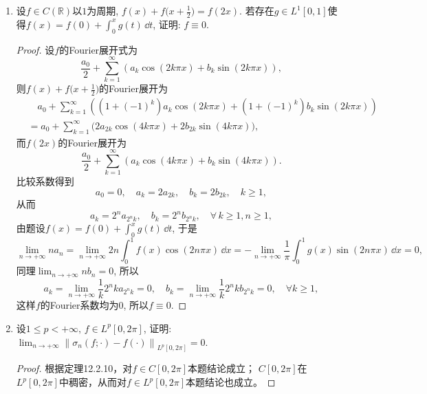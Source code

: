 \begin{quiza}
\begin{enumerate}
\begin{proof}[进阶]
\begin{align*}
=\lim _{n \rightarrow+\infty} \frac{1}{n^2} \int_0^{\frac{\pi}{2}} \frac{\sin^4 nx}{x^3} \, d x \\
& = \lim_{n \rightarrow+\infty} \int_0^{\frac{n\pi}{2}} \frac{\sin^4 x}{x^3} \, d x
=\int_0^{+\infty} \frac{\sin^4 x}{x^3} \, d x
=\int_0^{+\infty} \frac{2 \sin^3 x \cos x}{x^2} \, d x \\
& = \int_0^{+\infty} \frac{6 \sin^2 x \cos^2 x-2 \sin^4 x}{x} \, d x
=\int_0^{+\infty} \frac{\cos 2x-\cos 4x}{x} \, d x \\
& = \ln 2,
\end{align*}
其上第二个等式为变量代换，第四第五个等式用了分部积分，第六个等式是三角函数恒等变换，
第七个等式用了 Frullani 公式（也可以通过对含参变量反常积分求导来计算）。
\end{proof}
\item 设\(f\in C(\mathbb{R})\)以\(1\)为周期, \(f(x)+f\bigg(x+\frac{1}{2}\bigg)=f(2x)\). 
若存在\(g\in L^1[0,1]\)使得\(f(x)=f(0)+\int_{0}^{x}g(t)\,\dd t\), 证明: \(f\equiv 0\).
\begin{proof}
设\(f\)的Fourier展开式为\[\frac{a_0}{2}+\sum_{k=1}^{\infty}\left(a_k\cos\left(2k\pi x\right)+b_k\sin\left(2k\pi x\right)\right),\]
则\(f(x)+f\Big(x+\frac{1}{2}\Big)\)的Fourier展开为\[\begin{split}
&\quad a_0+\sum_{k=1}^{\infty}\left(\left(1+(-1)^k\right)a_k\cos(2k\pi x)+\left(1+(-1)^k\right)b_k\sin(2k\pi x)\right)\\
&=a_0+\sum_{k=1}^{\infty}\big(2a_{2k}\cos(4k\pi x)+2b_{2k}\sin(4k\pi x)\big),
\end{split}\]而\(f(2x)\)的Fourier展开为
\[\frac{a_0}{2}+\sum_{k=1}^{\infty}\left(a_k\cos(4k\pi x)+b_k\sin(4k\pi x)\right).\]
比较系数得到\[a_0=0,\quad a_k=2a_{2k},\quad b_k=2b_{2k},\quad k\geqslant 1,\]
从而\[a_k=2^na_{2^nk},\quad b_k=2^nb_{2^nk},\quad\forall\, k\geqslant 1,n\geqslant 1,\]
由题设\(f(x)=f(0)+\int_{0}^{x}g(t)\,\dd t\), 于是
\[\lim_{n\rightarrow+\infty}na_n=\lim_{n\rightarrow+\infty}2n\int_{0}^{1}f(x)\cos(2n\pi x)\,\dd x
=-\lim_{n\rightarrow+\infty}\frac{1}{\pi}\int_{0}^{1}g(x)\sin(2n\pi x)\,\dd x=0,\]
同理\(\lim_{n\rightarrow+\infty}nb_n=0\), 所以
\[a_k=\lim_{n\rightarrow+\infty}\frac{1}{k}2^nka_{2^nk}=0,\quad 
b_k=\lim_{n\rightarrow+\infty}\frac{1}{k}2^nkb_{2^nk}=0,\quad\forall k\geqslant 1,\]
这样\(f\)的Fourier系数均为\(0\), 所以\(f\equiv 0\).
\end{proof}
\item 设\(1\leqslant p<+\infty,\,f\in L^p[0,2\pi]\), 证明: \(\lim_{n\rightarrow+\infty}\left\|\sigma_n(f;\cdot)-f(\cdot)\right\|_{L^p[0,2\pi]}=0.\)
\begin{proof}
根据定理12.2.10，对$f\in C[0,2\pi]$本题结论成立；
$C[0,2\pi]$在$L^p[0,2\pi]$中稠密，从而对$f\in L^p[0,2\pi]$本题结论也成立。


\end{proof}
\end{enumerate}
\end{quiza}
